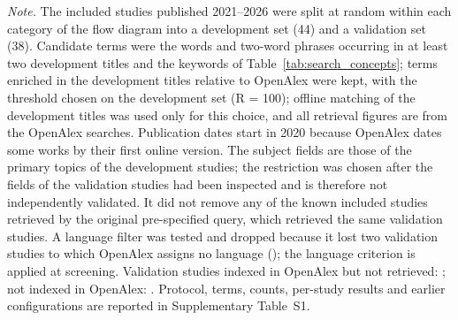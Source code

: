 \begin{table}[!htbp]
\vspace{4pt}
\begin{minipage}{13.4cm}
\scriptsize
\textit{Note.} The included studies published 2021--2026 were split at random within each category of the flow diagram into a development set (44) and a validation set (38). Candidate terms were the words and two-word phrases occurring in at least two development titles and the keywords of Table~\ref{tab:search_concepts}; terms enriched in the development titles relative to OpenAlex were kept, with the threshold chosen on the development set (R = 100); offline matching of the development titles was used only for this choice, and all retrieval figures are from the OpenAlex searches. Publication dates start in 2020 because OpenAlex dates some works by their first online version. The subject fields are those of the primary topics of the development studies; the restriction was chosen after the fields of the validation studies had been inspected and is therefore not independently validated. It did not remove any of the known included studies retrieved by the original pre-specified query, which retrieved the same validation studies. A language filter was tested and dropped because it lost two validation studies to which OpenAlex assigns no language (\citealp{cui2025toward,goldsmith2025causal}); the language criterion is applied at screening. Validation studies indexed in OpenAlex but not retrieved: \citealp{hrckova2025autonomation,liu2024exploring,smith2024unraveling,su2025emotionally,yang2025price,bradley2024place,roy2024unveiling}; not indexed in OpenAlex: \citealp{cayuela2025influence,kumarsocial}. Protocol, terms, counts, per-study results and earlier configurations are reported in Supplementary Table~S1.
\end{minipage}
\end{table}
